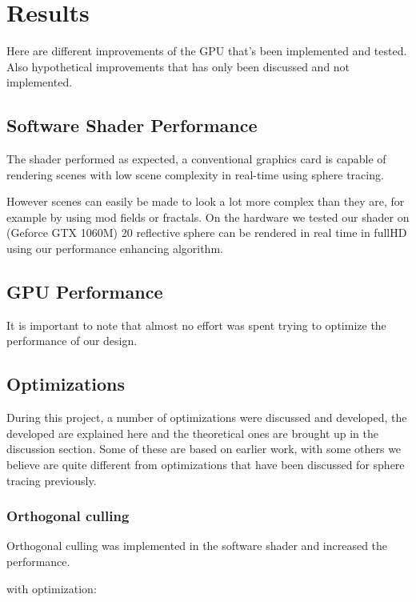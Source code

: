 \chapter{Results}

	Here are different improvements of the GPU that's been implemented and tested.
	Also hypothetical improvements that has only been discussed and not
	implemented.

	\section{Software Shader Performance}

		The shader performed as expected, a conventional graphics card is 
		capable of rendering scenes with low scene complexity in real-time
		using sphere tracing.

		However scenes can easily be made to look a lot more complex than they 
		are, for example by using mod fields or fractals. On the hardware we 
		tested our shader on (Geforce GTX 1060M) 20 reflective sphere can
		be rendered in real time in fullHD using our performance enhancing 
		algorithm.


	\section{GPU Performance}
		
		It is important to note that almost no effort was spent trying to
		optimize the performance of our design.

	\section{Optimizations}
		
		During this project, a number of optimizations were discussed and 
		developed, the developed are explained here and the theoretical ones
		are brought up in the discussion section. Some of these are based on earlier
		work, with some others we believe are quite different from optimizations
		that have been discussed for sphere tracing previously.

		\subsection{Orthogonal culling}
			Orthogonal culling was implemented in the software shader and increased 
			the performance.

			with optimization:

